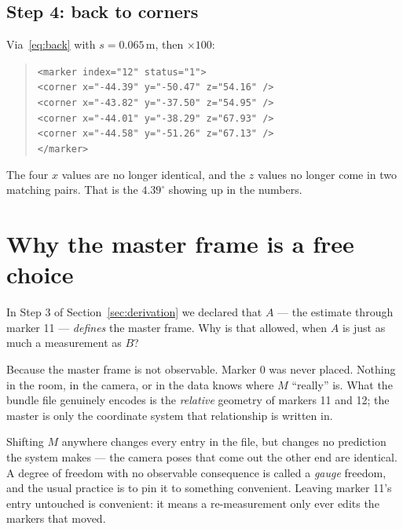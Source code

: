 \documentclass[11pt,a4paper]{article}
\begin{document}
\subsection{Step 4: back to corners}

Via~\eqref{eq:back} with $s = 0.065$\,m, then $\times 100$:

\begin{quote}\ttfamily\small
\begin{tabbing}
\texttt{<marker index="12" status="1">}\\
\quad\=\texttt{<corner x="-44.39" y="-50.47" z="54.16" />}\\
\>\texttt{<corner x="-43.82" y="-37.50" z="54.95" />}\\
\>\texttt{<corner x="-44.01" y="-38.29" z="67.93" />}\\
\>\texttt{<corner x="-44.58" y="-51.26" z="67.13" />}\\
\texttt{</marker>}
\end{tabbing}
\end{quote}

The four $x$ values are no longer identical, and the $z$ values no longer come in two
matching pairs. That is the $4.39^\circ$ showing up in the numbers.

\section{Why the master frame is a free choice}
\label{sec:gauge}

In Step 3 of Section~\ref{sec:derivation} we declared that $A$ --- the estimate through
marker 11 --- \emph{defines} the master frame. Why is that allowed, when $A$ is just as
much a measurement as $B$?

Because the master frame is not observable. Marker 0 was never placed. Nothing in the
room, in the camera, or in the data knows where $M$ ``really'' is. What the bundle file
genuinely encodes is the \emph{relative} geometry of markers 11 and 12; the master is
only the coordinate system that relationship is written in.

Shifting $M$ anywhere changes every entry in the file, but changes no prediction the
system makes --- the camera poses that come out the other end are identical. A degree of
freedom with no observable consequence is called a \emph{gauge} freedom, and the usual
practice is to pin it to something convenient. Leaving marker 11's entry untouched is
convenient: it means a re-measurement only ever edits the markers that moved.
\end{document}
